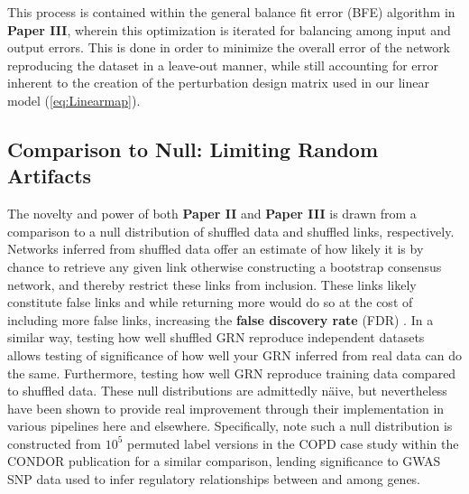 This process is contained within the general balance fit error (BFE) algorithm in \textbf{Paper III}, wherein this optimization is iterated for balancing among input and output errors. This is done in order to minimize the overall error of the network reproducing the dataset in a leave-out manner, while still accounting for error inherent to the creation of the perturbation design matrix used in our linear model (\cref{eq:Linearmap}).

\subsection{Comparison to Null: Limiting Random Artifacts}
\label{sec:null}
The novelty and power of both \textbf{Paper II} and \textbf{Paper III} is drawn from a comparison to a null distribution of shuffled data and shuffled links, respectively. Networks inferred from shuffled data offer an estimate of how likely it is by chance to retrieve any given link otherwise constructing a bootstrap consensus network, and thereby restrict these links from inclusion. These links likely constitute false links and while returning more would do so at the cost of including more false links, increasing the \textbf{false discovery rate} (FDR) \citep{kall2007posterior}. In a similar way, testing how well shuffled GRN reproduce independent datasets allows testing of significance of how well your GRN inferred from real data can do the same. Furthermore, testing how well GRN reproduce training data compared to shuffled data. These null distributions are admittedly n{\"a}ive, but nevertheless have been shown to provide real improvement through their implementation in various pipelines here and elsewhere. Specifically, note such a null distribution is constructed from $10^5$ permuted label versions \cite{platig2016bipartite} in the COPD case study within the CONDOR publication for a similar comparison, lending significance to GWAS SNP data used to infer regulatory relationships between and among genes.